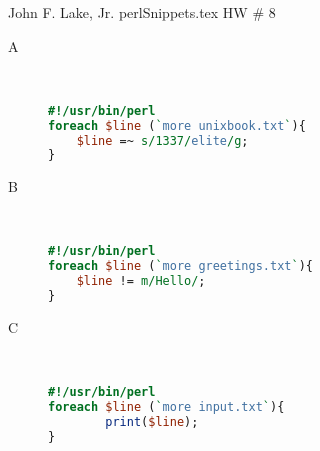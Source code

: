 \documentclass{article}
\begin{document}
John F. Lake, Jr. 
perlSnippets.tex
HW # 8


\begin{description}
\item[A] \hfill \\ 
\begin{lstlisting}[language = Perl]
#!/usr/bin/perl
foreach $line (`more unixbook.txt`){
	$line =~ s/1337/elite/g;
}
\end{lstlisting}
\item[B] \hfill \\ 
\begin{lstlisting}[language = Perl]
#!/usr/bin/perl
foreach $line (`more greetings.txt`){
	$line != m/Hello/;
}
\end{lstlisting}
\item[C] \hfill \\ 
\begin{lstlisting}[language = Perl]
#!/usr/bin/perl
foreach $line (`more input.txt`){
        print($line);
}
\end{lstlisting}
\end{description}
\end{document}
